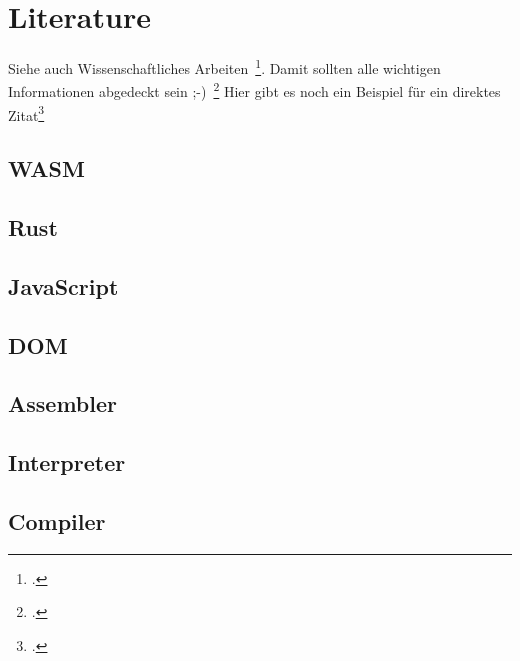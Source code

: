 \newpage
\section{Literature} \label{infos}
Siehe auch Wissenschaftliches Arbeiten~\footcite[\vglf][S. 1]{Balzert.2008}. %
Damit sollten alle wichtigen Informationen abgedeckt sein ;-)~\footcite[\vglf][]{Balzert.2008} %
Hier gibt es noch ein Beispiel für ein direktes Zitat\footcite[][]{Balzert.2008} %

\subsection{WASM}

\subsection{Rust}

\subsection{JavaScript}

\subsection{DOM}

\subsection{Assembler}

\subsection{Interpreter}

\subsection{Compiler}
